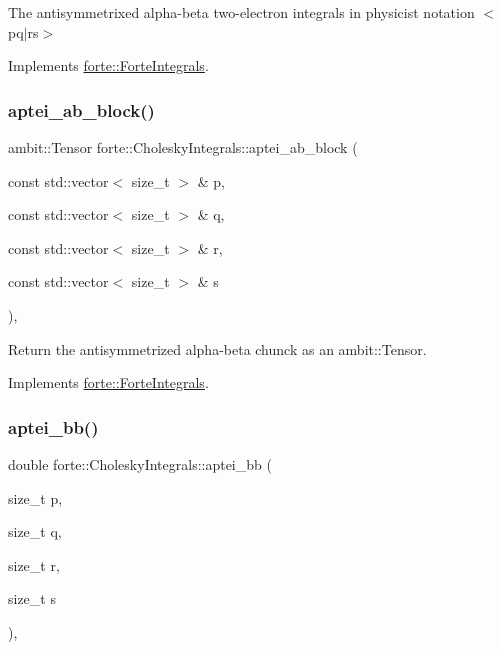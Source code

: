 The antisymmetrixed alpha-\/beta two-\/electron integrals in physicist notation $<$pq$\vert$rs$>$ 



Implements \mbox{\hyperlink{classforte_1_1_forte_integrals_a45efc2329cdfc7e4690cbe85688b947e}{forte\+::\+Forte\+Integrals}}.

\mbox{\label{classforte_1_1_cholesky_integrals_af9aff1a966a4e520aa4cc62afd1c6998}} 
\subsubsection{\texorpdfstring{aptei\+\_\+ab\+\_\+block()}{aptei\_ab\_block()}}
{\footnotesize\ttfamily ambit\+::\+Tensor forte\+::\+Cholesky\+Integrals\+::aptei\+\_\+ab\+\_\+block (\begin{DoxyParamCaption}\item[{const std\+::vector$<$ size\+\_\+t $>$ \&}]{p,  }\item[{const std\+::vector$<$ size\+\_\+t $>$ \&}]{q,  }\item[{const std\+::vector$<$ size\+\_\+t $>$ \&}]{r,  }\item[{const std\+::vector$<$ size\+\_\+t $>$ \&}]{s }\end{DoxyParamCaption})\hspace{0.3cm}{\ttfamily [override]}, {\ttfamily [virtual]}}



Return the antisymmetrized alpha-\/beta chunck as an ambit\+::\+Tensor. 



Implements \mbox{\hyperlink{classforte_1_1_forte_integrals_acd40e350dc861baf8adf6a3b47c74023}{forte\+::\+Forte\+Integrals}}.

\mbox{\label{classforte_1_1_cholesky_integrals_a02acd5ac863dcc1577c8b481ab80e8b6}} 
\subsubsection{\texorpdfstring{aptei\+\_\+bb()}{aptei\_bb()}}
{\footnotesize\ttfamily double forte\+::\+Cholesky\+Integrals\+::aptei\+\_\+bb (\begin{DoxyParamCaption}\item[{size\+\_\+t}]{p,  }\item[{size\+\_\+t}]{q,  }\item[{size\+\_\+t}]{r,  }\item[{size\+\_\+t}]{s }\end{DoxyParamCaption})\hspace{0.3cm}{\ttfamily [override]}, {\ttfamily [virtual]}}



